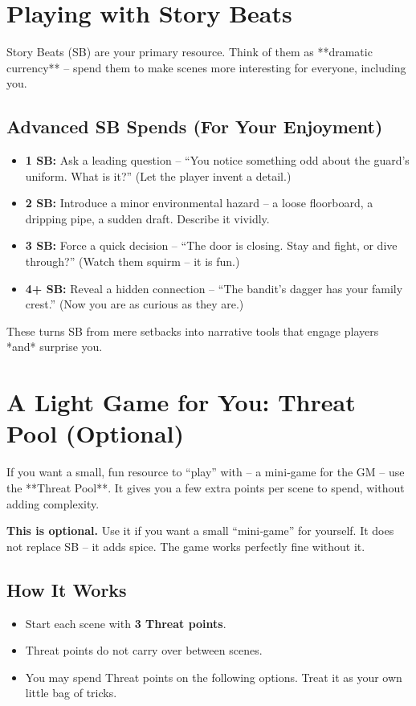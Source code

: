 \section{Playing with Story Beats}

Story Beats (SB) are your primary resource. Think of them as **dramatic currency** – spend them to make scenes more interesting for everyone, including you.

\subsection*{Advanced SB Spends (For Your Enjoyment)}
\begin{itemize}
  \item \textbf{1 SB:} Ask a leading question – “You notice something odd about the guard’s uniform. What is it?” (Let the player invent a detail.)
  \item \textbf{2 SB:} Introduce a minor environmental hazard – a loose floorboard, a dripping pipe, a sudden draft. Describe it vividly.
  \item \textbf{3 SB:} Force a quick decision – “The door is closing. Stay and fight, or dive through?” (Watch them squirm – it is fun.)
  \item \textbf{4+ SB:} Reveal a hidden connection – “The bandit’s dagger has your family crest.” (Now you are as curious as they are.)
\end{itemize}
These turns SB from mere setbacks into narrative tools that engage players *and* surprise you.

\section{A Light Game for You: Threat Pool (Optional)}
\label{sec:threat-pool}

If you want a small, fun resource to “play” with – a mini‑game for the GM – use the **Threat Pool**. It gives you a few extra points per scene to spend, without adding complexity.

\begin{tcolorbox}[colback=yellow!5!white, colframe=yellow!75!black, title=Optional – Not a Replacement for SB]
  \textbf{This is optional.} Use it if you want a small “mini‑game” for yourself. It does not replace SB – it adds spice. The game works perfectly fine without it.
\end{tcolorbox}

\subsection*{How It Works}
\begin{itemize}
  \item Start each scene with \textbf{3 Threat points}.
  \item Threat points do not carry over between scenes.
  \item You may spend Threat points on the following options. Treat it as your own little bag of tricks.
\end{itemize}


